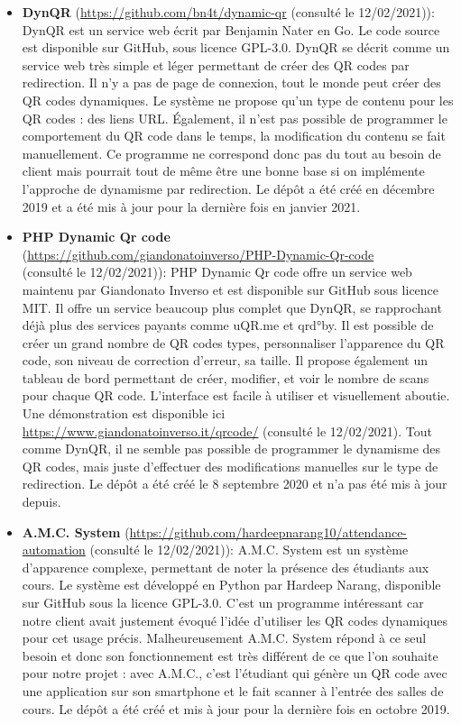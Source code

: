 \documentclass[a4paper,12pt]{article}
\begin{document}
\begin{itemize}
    \item \textbf{DynQR} (\url{https://github.com/bn4t/dynamic-qr} (consulté le 12/02/2021)):\\ 
    DynQR est un service web écrit par Benjamin Nater en Go. Le code source est disponible sur GitHub, sous licence GPL-3.0. DynQR se décrit comme un service web très simple et léger permettant de créer des QR codes par redirection. Il n'y a pas de page de connexion, tout le monde peut créer des QR codes dynamiques. Le système ne propose qu'un type de contenu pour les QR codes : des liens URL. Également, il n'est pas possible de programmer le comportement du QR code dans le temps, la modification du contenu se fait manuellement. Ce programme ne correspond donc pas du tout au besoin de client mais pourrait tout de même être une bonne base si on implémente l'approche de dynamisme par redirection. Le dépôt a été créé en décembre 2019 et a été mis à jour pour la dernière fois en janvier 2021.\\
    
    \item \textbf{PHP Dynamic Qr code}\\(\url{https://github.com/giandonatoinverso/PHP-Dynamic-Qr-code}\\
    (consulté le 12/02/2021)): PHP Dynamic Qr code offre un service web maintenu par Giandonato Inverso et est disponible sur GitHub sous licence MIT. Il offre un service beaucoup plus complet que DynQR, se rapprochant déjà plus des services payants comme uQR.me et qrd°by. Il est possible de créer un grand nombre de QR codes types, personnaliser l'apparence du QR code, son niveau de correction d'erreur, sa taille. Il propose également un tableau de bord permettant de créer, modifier, et voir le nombre de scans pour chaque QR code. L'interface est facile à utiliser et visuellement aboutie. Une démonstration est disponible ici \url{https://www.giandonatoinverso.it/qrcode/} (consulté le 12/02/2021). Tout comme DynQR, il ne semble pas possible de programmer le dynamisme des QR codes, mais juste d'effectuer des modifications manuelles sur le type de redirection. Le dépôt a été créé le 8 septembre 2020 et n'a pas été mis à jour depuis.\\
    
    \item \textbf{A.M.C. System} (\url{https://github.com/hardeepnarang10/attendance-automation} (consulté le 12/02/2021)): A.M.C. System est un système d'apparence complexe, permettant de noter la présence des étudiants aux cours. Le système est développé en Python par Hardeep Narang, disponible sur GitHub sous la licence GPL-3.0. C'est un programme intéressant car notre client avait justement évoqué l'idée d'utiliser les QR codes dynamiques pour cet usage précis. Malheureusement A.M.C. System répond à ce seul besoin et donc son fonctionnement est très différent de ce que l'on souhaite pour notre projet : avec  A.M.C., c'est l'étudiant qui génère un QR code avec une application sur son smartphone et le fait scanner à l'entrée des salles de cours. Le dépôt a été créé et mis à jour pour la dernière fois en octobre 2019.\\
    
\end{itemize}
\end{document}
